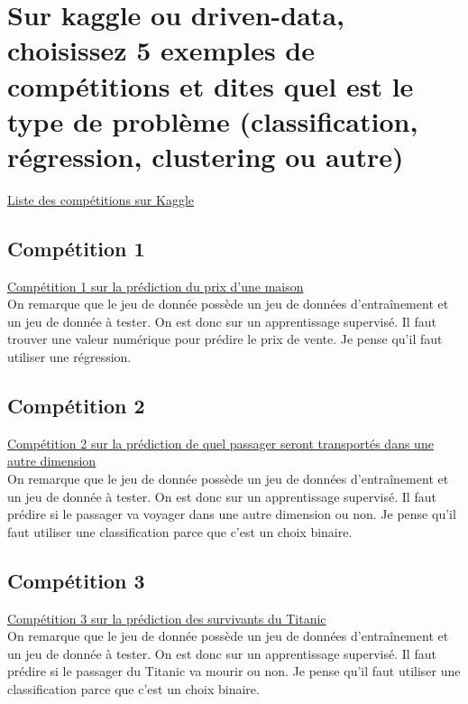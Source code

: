 \newpage
\section{Sur kaggle ou driven-data, choisissez 5 exemples de compétitions et dites quel est le type de problème (classification, régression, clustering ou autre)}

\href{https://www.kaggle.com/competitions}{Liste des compétitions sur Kaggle}


\subsection{Compétition 1} 
\href{https://www.kaggle.com/competitions/house-prices-advanced-regression-techniques/data}{Compétition 1 sur la prédiction du prix d'une maison}\\

On remarque que le jeu de donnée possède un jeu de données d’entraînement et un jeu de donnée à tester. On est donc sur un apprentissage supervisé. Il faut trouver une valeur numérique pour prédire le prix de vente. Je pense qu’il faut utiliser une régression.


\subsection{Compétition 2} 
\href{https://www.kaggle.com/competitions/spaceship-titanic/overview}{Compétition 2 sur la prédiction de quel passager seront transportés dans une autre dimension}\\

On remarque que le jeu de donnée possède un jeu de données d’entraînement et un jeu de donnée à tester. On est donc sur un apprentissage supervisé. Il faut prédire si le passager va voyager dans une autre dimension ou non. Je pense qu’il faut utiliser une classification parce que c’est un choix binaire.


\subsection{Compétition 3} 
\href{https://www.kaggle.com/competitions/titanic/overview}{Compétition 3 sur la prédiction des survivants du Titanic}\\

On remarque que le jeu de donnée possède un jeu de données d’entraînement et un jeu de donnée à tester. On est donc sur un apprentissage supervisé. Il faut prédire si le passager du Titanic va mourir ou non. Je pense qu’il faut utiliser une classification parce que c’est un choix binaire.


